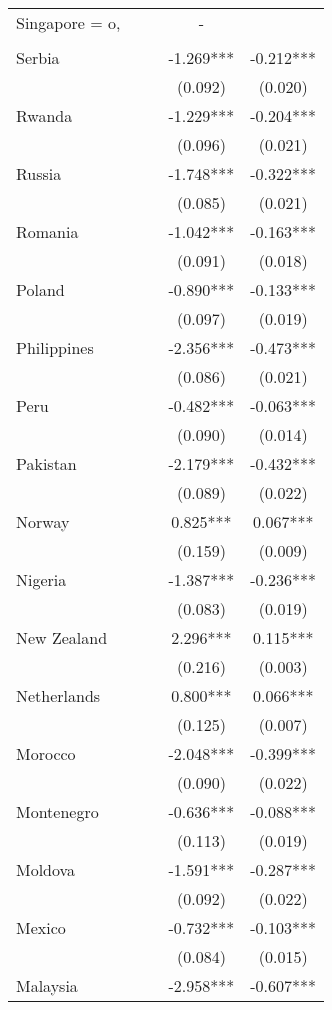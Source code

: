 \documentclass[]{article}
\begin{document}
\begin{tabular}{lcccc}
Singapore = o, &  &  & - &  \\
 &  &  &  &  \\
Serbia &  &  & -1.269*** & -0.212*** \\
 &  &  & (0.092) & (0.020) \\
Rwanda &  &  & -1.229*** & -0.204*** \\
 &  &  & (0.096) & (0.021) \\
Russia &  &  & -1.748*** & -0.322*** \\
 &  &  & (0.085) & (0.021) \\
Romania &  &  & -1.042*** & -0.163*** \\
 &  &  & (0.091) & (0.018) \\
Poland &  &  & -0.890*** & -0.133*** \\
 &  &  & (0.097) & (0.019) \\
Philippines &  &  & -2.356*** & -0.473*** \\
 &  &  & (0.086) & (0.021) \\
Peru &  &  & -0.482*** & -0.063*** \\
 &  &  & (0.090) & (0.014) \\
Pakistan &  &  & -2.179*** & -0.432*** \\
 &  &  & (0.089) & (0.022) \\
Norway &  &  & 0.825*** & 0.067*** \\
 &  &  & (0.159) & (0.009) \\
Nigeria &  &  & -1.387*** & -0.236*** \\
 &  &  & (0.083) & (0.019) \\
New Zealand &  &  & 2.296*** & 0.115*** \\
 &  &  & (0.216) & (0.003) \\
Netherlands &  &  & 0.800*** & 0.066*** \\
 &  &  & (0.125) & (0.007) \\
Morocco &  &  & -2.048*** & -0.399*** \\
 &  &  & (0.090) & (0.022) \\
Montenegro &  &  & -0.636*** & -0.088*** \\
 &  &  & (0.113) & (0.019) \\
Moldova &  &  & -1.591*** & -0.287*** \\
 &  &  & (0.092) & (0.022) \\
Mexico &  &  & -0.732*** & -0.103*** \\
 &  &  & (0.084) & (0.015) \\
Malaysia &  &  & -2.958*** & -0.607*** \\

\end{tabular}
\end{document}
